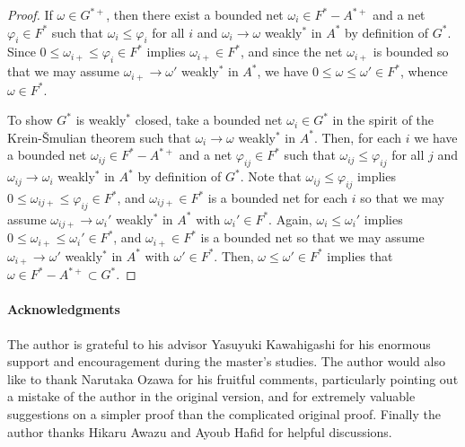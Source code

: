 \documentclass{CUP-JNL-FMP}
\theoremstyle{plain}
\theoremstyle{definition}
\begin{document}
\begin{proof}
If $\omega\in G^{*+}$, then there exist a bounded net $\omega_i\in F^*-A^{*+}$ and a net $\varphi_i\in F^*$ such that $\omega_i\le\varphi_i$ for all $i$ and $\omega_i\to\omega$ weakly$^*$ in $A^*$ by definition of $G^*$.
Since $0\le\omega_{i+}\le\varphi_i\in F^*$ implies $\omega_{i+}\in F^*$, and since the net $\omega_{i+}$ is bounded so that we may assume $\omega_{i+}\to\omega'$ weakly$^*$ in $A^*$, we have $0\le\omega\le\omega'\in F^*$, whence $\omega\in F^*$.

To show $G^*$ is weakly$^*$ closed, take a bounded net $\omega_i\in G^*$ in the spirit of the Krein-\v Smulian theorem such that $\omega_i\to\omega$ weakly$^*$ in $A^*$.
Then, for each $i$ we have a bounded net $\omega_{ij}\in F^*-A^{*+}$ and a net $\varphi_{ij}\in F^*$ such that $\omega_{ij}\le\varphi_{ij}$ for all $j$ and $\omega_{ij}\to\omega_i$ weakly$^*$ in $A^*$ by definition of $G^*$.
Note that $\omega_{ij}\le\varphi_{ij}$ implies $0\le\omega_{ij+}\le\varphi_{ij}\in F^*$, and $\omega_{ij+}\in F^*$ is a bounded net for each $i$ so that we may assume $\omega_{ij+}\to\omega_i'$ weakly$^*$ in $A^*$ with $\omega_i'\in F^*$.
Again, $\omega_i\le\omega_i'$ implies $0\le\omega_{i+}\le\omega_i'\in F^*$, and $\omega_{i+}\in F^*$ is a bounded net so that we may assume $\omega_{i+}\to\omega'$ weakly$^*$ in $A^*$ with $\omega'\in F^*$.
Then, $\omega\le\omega'\in F^*$ implies that $\omega\in F^*-A^{*+}\subset G^*$.
\end{proof}



\begin{Backmatter}
\paragraph{Acknowledgments}
The author is grateful to his advisor Yasuyuki Kawahigashi for his enormous support and encouragement during the master's studies.
The author would also like to thank Narutaka Ozawa for his fruitful comments, particularly pointing out a mistake of the author in the original version, and for extremely valuable suggestions on a simpler proof than the complicated original proof.
Finally the author thanks Hikaru Awazu and Ayoub Hafid for helpful discussions.



\end{Backmatter}
\end{document}
